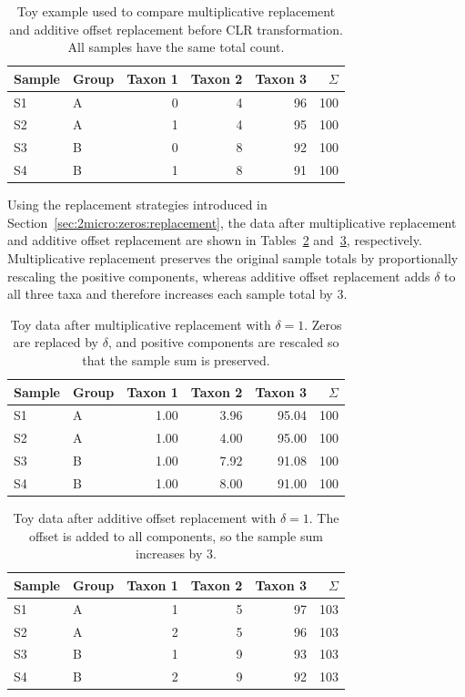 \begin{table}[ht]
\centering
\caption{Toy example used to compare multiplicative replacement and additive offset replacement before CLR transformation. All samples have the same total count.}
\label{tab:toy_zero_example_original}
\begin{tabular}{llrrrr}
\toprule
Sample & Group & Taxon 1 & Taxon 2 & Taxon 3 & $\Sigma$ \\
\midrule
S1 & A & 0 & 4 & 96 & 100 \\
S2 & A & 1 & 4 & 95 & 100 \\
S3 & B & 0 & 8 & 92 & 100 \\
S4 & B & 1 & 8 & 91 & 100 \\
\bottomrule
\end{tabular}
\end{table}

Using the replacement strategies introduced in Section~\ref{sec:2micro:zeros:replacement}, the data after multiplicative replacement and additive offset replacement are shown in Tables~\ref{tab:toy_zero_example_mult_replacement} and~\ref{tab:toy_zero_example_additive_offset}, respectively. Multiplicative replacement preserves the original sample totals by proportionally rescaling the positive components, whereas additive offset replacement adds $\delta$ to all three taxa and therefore increases each sample total by $3$.

\begin{table}[ht]
\centering
\caption{Toy data after multiplicative replacement with $\delta=1$. Zeros are replaced by $\delta$, and positive components are rescaled so that the sample sum is preserved.}
\label{tab:toy_zero_example_mult_replacement}
\begin{tabular}{llrrrr}
\toprule
Sample & Group & Taxon 1 & Taxon 2 & Taxon 3 & $\Sigma$ \\
\midrule
S1 & A & 1.00 & 3.96 & 95.04 & 100 \\
S2 & A & 1.00 & 4.00 & 95.00 & 100 \\
S3 & B & 1.00 & 7.92 & 91.08 & 100 \\
S4 & B & 1.00 & 8.00 & 91.00 & 100 \\
\bottomrule
\end{tabular}
\end{table}

\begin{table}[ht]
\centering
\caption{Toy data after additive offset replacement with $\delta=1$. The offset is added to all components, so the sample sum increases by $3$.}
\label{tab:toy_zero_example_additive_offset}
\begin{tabular}{llrrrr}
\toprule
Sample & Group & Taxon 1 & Taxon 2 & Taxon 3 & $\Sigma$ \\
\midrule
S1 & A & 1 & 5 & 97 & 103 \\
S2 & A & 2 & 5 & 96 & 103 \\
S3 & B & 1 & 9 & 93 & 103 \\
S4 & B & 2 & 9 & 92 & 103 \\
\bottomrule
\end{tabular}
\end{table}

